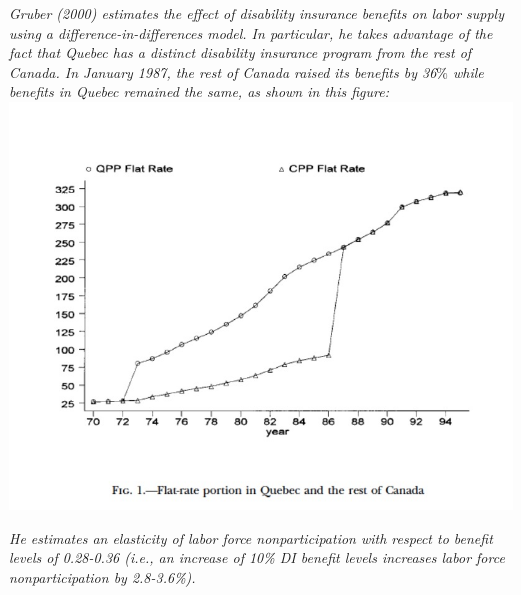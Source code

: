 \documentclass[
]{article}
\begin{document}
\textit{Gruber (2000) estimates the effect of disability insurance benefits on labor supply using a difference-in-differences model. In particular, he takes advantage of the fact that Quebec has a distinct disability insurance program from the rest of Canada. In January 1987, the rest of Canada raised its benefits by 36$\%$ while benefits in Quebec remained the same, as shown in this figure:}\\
\includegraphics{Gruber.jpg}

\emph{He estimates an elasticity of labor force nonparticipation with
respect to benefit levels of 0.28-0.36 (i.e., an increase of 10\% DI
benefit levels increases labor force nonparticipation by 2.8-3.6\%).}
\end{document}
